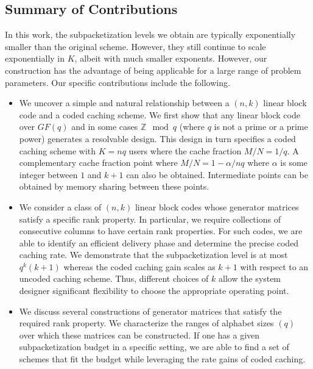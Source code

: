 \documentclass[journal,twocolumn]{IEEEtran}
\theoremstyle{definition}
\newcommand{\aditya}[1]{\marginpar{+}{\bf Aditya's remark}: {\em #1}}
\begin{document}
\subsection{Summary of Contributions}
In this work, the subpacketization levels we obtain are typically exponentially smaller than the original scheme. However, they still continue to scale exponentially in $K$, albeit with much smaller exponents. However, our construction has the advantage of being applicable for a large range of problem parameters.
Our specific contributions include the following.
\begin{itemize}
\item We uncover a simple and natural relationship between a $(n,k)$ linear block code and a coded caching scheme. We first show that any linear block code over $GF(q)$ and in some cases $\mathbb{Z} \mod q$ (where $q$ is not a prime or a prime power) generates a resolvable design. This design in turn specifies a coded caching scheme with $K=nq$ users where the cache fraction $M/N = 1/q$. A complementary cache fraction point where $M/N = 1 - \alpha/nq$ where $\alpha$ is some integer between $1$ and $k+1$ can also be obtained. Intermediate points can be obtained by memory sharing between these points.
\item We consider a class of $(n,k)$ linear block codes whose generator matrices satisfy a specific rank property. In particular, we require collections of consecutive columns to have certain rank properties. For such codes, we are able to identify an efficient delivery phase and determine the precise coded caching rate. We demonstrate that the subpacketization level is at most $q^k (k+1)$ whereas the coded caching gain scales as $k+1$ with respect to an uncoded caching scheme. Thus, different choices of $k$ allow the system designer significant flexibility to choose the appropriate operating point.
\item We discuss several constructions of generator matrices that satisfy the required rank property. We characterize the ranges of alphabet sizes $(q)$ over which these matrices can be constructed. If one has a given subpacketization budget in a specific setting, we are able to find a set of schemes that fit the budget while leveraging the rate gains of coded caching.
\end{itemize}
\end{document}
